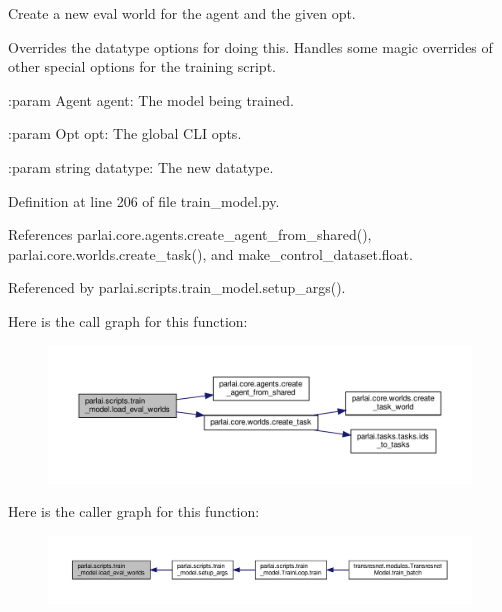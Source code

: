 \begin{DoxyVerb}Create a new eval world for the agent and the given opt.

Overrides the datatype options for doing this.  Handles some magic
overrides of other special options for the training script.

:param Agent agent:
    The model being trained.

:param Opt opt:
    The global CLI opts.

:param string datatype:
    The new datatype.
\end{DoxyVerb}
 

Definition at line 206 of file train\+\_\+model.\+py.



References parlai.\+core.\+agents.\+create\+\_\+agent\+\_\+from\+\_\+shared(), parlai.\+core.\+worlds.\+create\+\_\+task(), and make\+\_\+control\+\_\+dataset.\+float.



Referenced by parlai.\+scripts.\+train\+\_\+model.\+setup\+\_\+args().

Here is the call graph for this function\+:
\nopagebreak
\begin{figure}[H]
\begin{center}
\leavevmode
\includegraphics[width=350pt]{namespaceparlai_1_1scripts_1_1train__model_a70da71a6f4f9ad144666e6353d9278e3_cgraph}
\end{center}
\end{figure}
Here is the caller graph for this function\+:
\nopagebreak
\begin{figure}[H]
\begin{center}
\leavevmode
\includegraphics[width=350pt]{namespaceparlai_1_1scripts_1_1train__model_a70da71a6f4f9ad144666e6353d9278e3_icgraph}
\end{center}
\end{figure}
\mbox{\label{namespaceparlai_1_1scripts_1_1train__model_a496dfe3bf04da9b55d261b4c8d6229a7}} 
